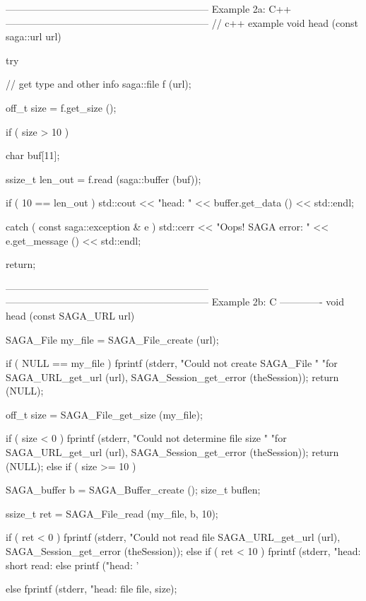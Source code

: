 \begin{mycode}
    --------------------------------------------------------------
    Example 2a: C++
    --------------------------------------------------------------
    // c++ example
    void head (const saga::url url)
    {
      try {
        // get type and other info
        saga::file f (url);
 
        off_t size = f.get_size ();
 
        if ( size > 10 )
        {
          char   buf[11];
 
          ssize_t len_out = f.read (saga::buffer (buf));
 
          if ( 10 == len_out )
          {
            std::cout << "head: "
                      << buffer.get_data ()
                      << std::endl;
          }
        }
      }
 
      catch ( const saga::exception & e )
      {
        std::cerr << "Oops! SAGA error: " 
                  << e.get_message () 
                  << std::endl;
      }
 
      return;
    }
    --------------------------------------------------------------
    --------------------------------------------------------------
    Example 2b: C
    -------------
      void head (const SAGA_URL url)
      {
        SAGA_File my_file = SAGA_File_create (url);
  
        if ( NULL == my_file )
        {
          fprintf (stderr, "Could not create SAGA_File "
                           "for %
                   SAGA_URL_get_url (url), 
                   SAGA_Session_get_error (theSession));
          return (NULL);
        }
  
        off_t size = SAGA_File_get_size (my_file);
  
        if ( size < 0 )
        {
          fprintf (stderr, "Could not determine file size "
                           "for %
                   SAGA_URL_get_url (url), 
                   SAGA_Session_get_error (theSession));
          return (NULL);
        }
        else if ( size >= 10 )
        {
          SAGA_buffer b = SAGA_Buffer_create ();
          size_t buflen;
  
          ssize_t ret = SAGA_File_read (my_file, b, 10);
  
          if ( ret < 0 )
          {
            fprintf (stderr, "Could not read file %
                     SAGA_URL_get_url (url), 
                     SAGA_Session_get_error (theSession));
          }
          else if ( ret < 10 )
          {
            fprintf (stderr, "head: short read: %
          }
          else
          {
            printf ("head: '%
          }
        }
        else
        {
          fprintf (stderr, "head: file %
                   file, size);
        }
 
}
\end{mycode}
